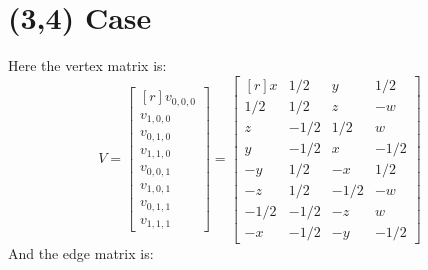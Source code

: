 \documentclass[12pt,titlepage]{article}
\numberwithin{equation}{section}
\begin{document}
\section{(3,4) Case}

Here the vertex matrix is:
\begin{equation*}
V =
\begin{bmatrix*}[r]
v_{0,0,0} \\
v_{1,0,0} \\
v_{0,1,0} \\
v_{1,1,0} \\
v_{0,0,1} \\
v_{1,0,1} \\
v_{0,1,1} \\
v_{1,1,1}
\end{bmatrix*}
=
\begin{bmatrix*}[r]
   x &  1/2 &    y &  1/2 \\
 1/2 &  1/2 &    z &   -w \\
   z & -1/2 &  1/2 &    w \\
   y & -1/2 &    x & -1/2 \\
  -y &  1/2 &   -x &  1/2 \\
  -z &  1/2 & -1/2 &   -w \\
-1/2 & -1/2 &   -z &    w \\
  -x & -1/2 &   -y & -1/2
\end{bmatrix*}
\end{equation*}
And the edge matrix is:
\end{document}
